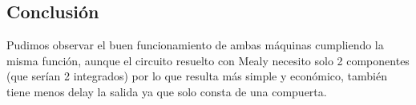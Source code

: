 \documentclass[10pt,a4paper]{article}
\begin{document}
\subsection*{Conclusión}
Pudimos observar el buen funcionamiento de ambas máquinas cumpliendo la misma función, aunque el circuito resuelto con Mealy necesito solo 2 componentes (que serían 2 integrados) por lo que resulta más simple y económico, también tiene menos delay la salida ya que solo consta de una compuerta.
\end{document}
